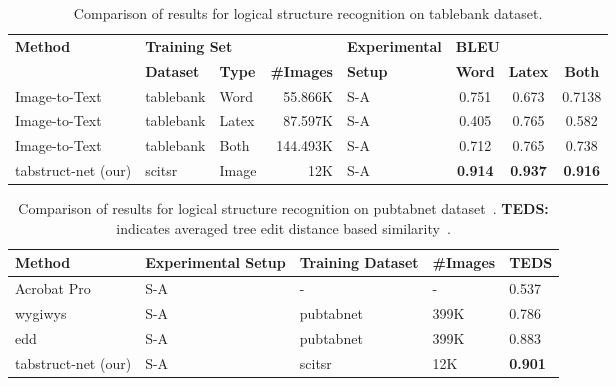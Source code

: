 \documentclass[runningheads]{llncs}
\begin{document}
\begin{table}
\begin{center}
\begin{tabular}{|l | l|l| r| l |c c c|} \hline
\textbf{Method} &\multicolumn{3}{|l|}{\textbf{Training Set}}  &\textbf{Experimental} &\multicolumn{3}{|l|}{\textbf{BLEU}} \\ \cline{2-4}\cline{6-8}
   &\textbf{Dataset} &\textbf{Type} &\textbf{\#Images} &\textbf{Setup} &\textbf{Word} &\textbf{Latex} &\textbf{Both} \\ \hline
Image-to-Text~\cite{paliwal2019tablenet} &{\sc t}able{\sc b}ank &Word &55.866K &S-A &0.751 &0.673 &0.7138 \\
Image-to-Text~\cite{paliwal2019tablenet} &{\sc t}able{\sc b}ank &Latex &87.597K &S-A &0.405 &0.765 &0.582 \\
Image-to-Text~\cite{paliwal2019tablenet} &{\sc t}able{\sc b}ank &Both &144.493K &S-A &0.712 &0.765 &0.738 \\
{\sc t}ab{\sc s}truct-{\sc n}et (our) &{\sc s}ci{\sc tsr} &Image &12K &S-A &\textbf{0.914} &\textbf{0.937} &\textbf{0.916} \\ \hline 
\end{tabular}
\end{center}
\caption{Comparison of results for logical structure recognition on {\sc t}able{\sc b}ank dataset.\label{table_logical_tablebank}}
\vspace{-1.5em}
\end{table}

\begin{table}
\begin{center}
\begin{tabular}{|l |l |l |l |l |} \hline
\textbf{Method} &\textbf{Experimental Setup} &\textbf{Training Dataset} &\textbf{\#Images}&\textbf{TEDS} \\ \hline
Acrobat Pro~\cite{zhong2019image}  &S-A & - & - &0.537 \\
{\sc wygiwys}~\cite{zhong2019image} &S-A &{\sc p}ub{\sc t}ab{\sc n}et &399K &0.786 \\
{\sc edd}~\cite{zhong2019image} &S-A &{\sc p}ub{\sc t}ab{\sc n}et &399K &0.883 \\
{\sc t}ab{\sc s}truct-{\sc n}et (our) &S-A &{\sc s}ci{\sc tsr}~\cite{chi2019complicated} &12K &\textbf{0.901} \\ \hline
\end{tabular}
\end{center}
\caption{Comparison of results for logical structure recognition on {\sc p}ub{\sc t}ab{\sc n}et dataset~\cite{zhong2019image}. \textbf{TEDS:} indicates averaged tree edit distance based similarity~\cite{zhong2019image}.} \label{table_logical_pubtabnet}
\end{table}
\end{document}
